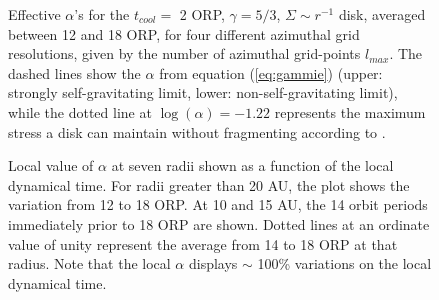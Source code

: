 \documentclass[manuscript]{aastex}
\begin{document}
\begin{figure}
\caption
{Effective $\alpha$'s for the $t_{cool} =$ 2 ORP, $\gamma = 5/3$, $\Sigma \sim r^{ -1}$ disk, averaged between 12 and 18
  ORP, for four different azimuthal grid resolutions, given by the number of azimuthal grid-points $l_{max}$. The
  dashed lines show the $\alpha$ from equation (\ref{eq:gammie}) (upper: strongly self-gravitating limit, lower:
  non-self-gravitating limit), while the dotted line at $\log(\alpha) = -1.22$ represents the maximum stress a disk can
  maintain without fragmenting according to \citet{rice2005}. 
}
\label{fig:alpha_v_radius}
\end{figure}
\newpage

\begin{figure}
\caption{
Local value of $\alpha$ at seven radii shown as a function of the local dynamical time.  For radii greater than 20 AU, the plot shows 
the variation from 12 to 18 ORP.  At 10 and 15 AU, the 14 orbit periods immediately prior to 18 ORP are shown.
Dotted lines at an ordinate value of unity represent the average from 14 to 18 ORP at that radius.
Note that the local $\alpha$ displays $\sim$ 100\% variations on the local dynamical time. 
}
\label{fig:alphavar}
\end{figure}
\end{document}
